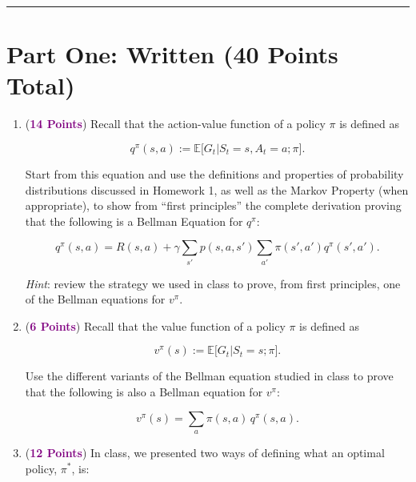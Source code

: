 \documentclass{article}
\newcommand{\POINTS}[1]{\textcolor{purple}{\textbf{{#1}}}}
\begin{document}
\noindent\rule{\textwidth}{1pt}

\section*{Part One: Written (40 Points Total)}
\begin{enumerate}
    \item (\POINTS{14 Points}) Recall that the action-value function of a policy $\pi$ is defined as
    
    \begin{equation}
        q^\pi(s,a) := \mathbb{E} \big[G_t | S_t=s, A_t=a; \pi\big]. 
    \end{equation}
    
    Start from this equation and use the definitions and properties of probability distributions discussed in Homework 1, as well as the Markov Property (when appropriate), to show from ``first principles'' the complete derivation proving that the following is a Bellman Equation for $q^\pi$:
    
    \begin{equation}
        q^\pi(s,a) = R(s,a) + \gamma \sum_{s'} p(s,a,s') \sum_{a'} \pi(s', a') q^{\pi}(s', a').
    \end{equation}
    
    \textit{Hint}: review the strategy we used in class to prove, from first principles, one of the Bellman equations for $v^\pi$.



    \item (\POINTS{6 Points}) Recall that the value function of a policy $\pi$ is defined as
    
    \begin{equation}
        v^\pi(s) := \mathbb{E} \big[G_t | S_t=s; \pi\big]. 
    \end{equation}

    Use the different variants of the Bellman equation studied in class to prove that the following is also a Bellman equation for $v^\pi$:
    
    \begin{equation}
        v^\pi(s) = \sum_a \pi(s,a) \, q^\pi(s,a).
    \end{equation}
    
    \item (\POINTS{12 Points}) In class, we presented two ways of defining what an optimal policy, $\pi^*$, is:
    

\end{enumerate}
\end{document}
